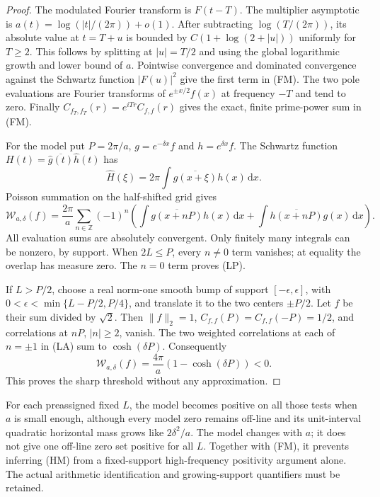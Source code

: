 \documentclass[11pt]{article}
\theoremstyle{remark}\newtheorem{remark}[theorem]{Remark}
\newcommand{\Z}{\mathbb Z}
\newcommand{\dd}{\,\mathrm d}
\begin{document}
\begin{proof}
The modulated Fourier transform is $F(t-T)$.
The multiplier asymptotic is
$a(t)=\log(|t|/(2\pi))+o(1)$.
After subtracting $\log(T/(2\pi))$, its absolute value
at $t=T+u$ is bounded by
$C(1+\log(2+|u|))$ uniformly for $T\ge2$.
This follows by splitting at $|u|=T/2$ and using the
global logarithmic growth and lower bound of $a$.
Pointwise convergence and dominated convergence against
the Schwartz function $|F(u)|^2$ give the first term in (FM).
The two pole evaluations are Fourier transforms of
$e^{\pm x/2}f(x)$ at frequency $-T$ and tend to zero.
Finally $C_{f_T,f_T}(r)=e^{iTr}C_{f,f}(r)$ gives
the exact, finite prime-power sum in (FM).

For the model put $P=2\pi/a$, $g=e^{-\delta x}f$ and
$h=e^{\delta x}f$. The Schwartz function
$H(t)=\overline{\widehat g(t)}\widehat h(t)$ has
\[
 \widehat H(\xi)=2\pi\int\overline{g(x+\xi)}h(x)\dd x.
\]
Poisson summation on the half-shifted grid gives
\[
 \mathcal W_{a,\delta}(f)=\frac{2\pi}{a}
 \sum_{n\in\Z}(-1)^n
 \left(\int\overline{g(x+nP)}h(x)\dd x
            +\int\overline{h(x+nP)}g(x)\dd x\right).   \tag{LA}
\]
All evaluation sums are absolutely convergent.
Only finitely many integrals can be nonzero, by support.
When $2L\le P$, every $n\ne0$ term vanishes; at equality
the overlap has measure zero. The $n=0$ term proves (LP).

If $L>P/2$, choose a real norm-one smooth bump of support
$[-\epsilon,\epsilon]$, with
$0<\epsilon<\min\{L-P/2,P/4\}$, and translate it to
the two centers $\pm P/2$. Let $f$ be their sum divided
by $\sqrt2$. Then $\|f\|_2=1$,
$C_{f,f}(P)=C_{f,f}(-P)=1/2$, and correlations at
$nP$, $|n|\ge2$, vanish. The two weighted correlations
at each of $n=\pm1$ in (LA) sum to $\cosh(\delta P)$.
Consequently
\[
 \mathcal W_{a,\delta}(f)
                 =\frac{4\pi}{a}(1-\cosh(\delta P))<0.
\]
This proves the sharp threshold without any approximation.
\end{proof}

For each preassigned fixed $L$, the model becomes positive on
all those tests when $a$ is small enough, although every model
zero remains off-line and its unit-interval quadratic horizontal
mass grows like $2\delta^2/a$. The model changes with $a$;
it does not give one off-line zero set positive for all $L$.
Together with (FM), it prevents inferring (HM) from a
fixed-support high-frequency positivity argument alone.
The actual arithmetic identification and growing-support
quantifiers must be retained.
\end{document}
